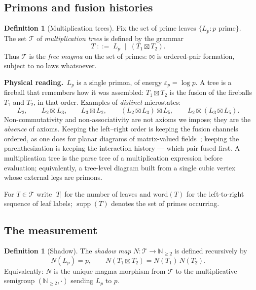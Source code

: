 \documentclass[11pt]{article}
\newcommand{\cT}{\mathcal{T}}   %
\newcommand{\NN}{\mathbb{N}}
\newcommand{\physread}{\medskip\noindent\textbf{Physical reading.}\ }
\DeclareMathOperator{\supp}{supp}
\numberwithin{equation}{section}
\theoremstyle{plain}
\theoremstyle{definition}
\newtheorem{definition}[theorem]{Definition}
\theoremstyle{remark}
\begin{document}
\subsection{Primons and fusion histories}

\begin{definition}[Multiplication trees]\label{def:trees}
Fix the set of prime leaves $\{L_p : p \text{ prime}\}$. The set $\cT$ of
\emph{multiplication trees} is defined by the grammar
\[
T \;::=\; L_p \;\mid\; (T_1 \boxtimes T_2).
\]
Thus $\cT$ is the \emph{free magma} on the set of primes: $\boxtimes$ is ordered-pair
formation, subject to no laws whatsoever.
\end{definition}

\physread $L_p$ is a single primon, of energy $\varepsilon_p = \log p$. A tree is a
fireball that remembers how it was assembled: $T_1 \boxtimes T_2$ is the fusion of the
fireballs $T_1$ and $T_2$, in that order. Examples of \emph{distinct} microstates:
\[
L_2, \qquad
L_2 \boxtimes L_3, \qquad
L_3 \boxtimes L_2, \qquad
(L_2 \boxtimes L_3) \boxtimes L_5, \qquad
L_2 \boxtimes (L_3 \boxtimes L_5).
\]
Non-commutativity and non-associativity are not axioms we impose; they are the
\emph{absence} of axioms. Keeping the left--right order is keeping the fusion channels
ordered, as one does for planar diagrams of matrix-valued fields~\cite{thooft};
keeping the parenthesization is keeping the interaction history --- which pair fused
first. A multiplication tree is the parse tree of a multiplication expression before
evaluation; equivalently, a tree-level diagram built from a single cubic vertex whose
external legs are primons.

For $T \in \cT$ write $|T|$ for the number of leaves and $\mathrm{word}(T)$ for the
left-to-right sequence of leaf labels; $\supp(T)$ denotes the set of primes occurring.

\subsection{The measurement}

\begin{definition}[Shadow]\label{def:shadow}
The \emph{shadow map} $N \colon \cT \to \NN_{\ge 2}$ is defined recursively by
\[
N(L_p) = p, \qquad N(T_1 \boxtimes T_2) = N(T_1)\,N(T_2).
\]
Equivalently: $N$ is the unique magma morphism from $\cT$ to the multiplicative
semigroup $(\NN_{\ge2},\cdot)$ sending $L_p$ to $p$.
\end{definition}
\end{document}
